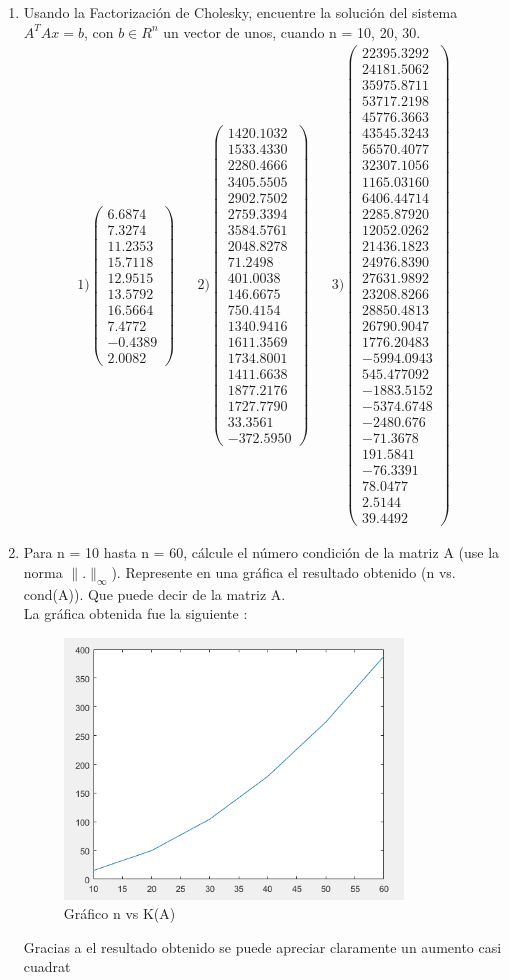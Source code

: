 \documentclass{udpreport}
\providecommand{\norm}[1]{\lVert#1\rVert}
\begin{document}
\begin{enumerate}
 	
 	 \begin {enumerate}
 	    \item Usando la Factorización de Cholesky, encuentre la solución del sistema $A^{T}Ax = b$, con $b \in R^{n}$  un vector de unos, cuando n = 10, 20, 30.
 	        \begin{align*}
 	             1) \left(\begin{array}{c} 6.6874\\7.3274\\11.2353\\15.7118\\ 12.9515\\ 13.5792\\ 16.5664\\ 7.4772\\ -0.4389\\ 2.0082 \end{array}\right) 	 &&   2) \left(\begin{array}{c} 1420.1032\\ 1533.4330\\ 2280.4666\\ 3405.5505\\ 2902.7502\\ 2759.3394\\ 3584.5761\\ 2048.8278\\ 71.2498\\ 401.0038\\ 146.6675\\ 750.4154\\ 1340.9416\\ 1611.3569\\ 1734.8001\\ 1411.6638\\ 1877.2176\\ 1727.7790\\ 33.3561\\ -372.5950 \end{array}\right)   &&  3) \left(\begin{array}{c} 22395.3292\\ 24181.5062\\ 35975.8711\\ 53717.2198\\ 45776.3663\\ 43545.3243\\ 56570.4077\\ 32307.1056\\ 1165.03160\\ 6406.44714\\ 2285.87920\\ 12052.0262\\ 21436.1823\\ 24976.8390\\ 27631.9892\\ 23208.8266\\ 28850.4813\\ 26790.9047\\ 1776.20483\\ -5994.0943\\ 545.477092\\ -1883.5152\\ -5374.6748\\ -2480.676\\ -71.3678\\ 191.5841\\ -76.3391\\ 78.0477\\ 2.5144\\ 39.4492 \end{array}\right) 
 	        \end{align*}
	        
 	        \item Para n = 10 hasta n = 60, cálcule el número condición de la matriz A (use la norma $\norm{.}_{\infty}$). Represente en una gráfica el resultado obtenido (n vs. cond(A)). Que puede decir de la matriz A.\\
 	        
 	        La gráfica obtenida fue la siguiente :
            \begin{figure}[H]
                \centering
                \includegraphics[width=9cm]{Grafico2b}
                \caption{Gráfico n vs K(A)} \label{fig:Grafico2b}
            \end{figure}
            
            Gracias a el resultado obtenido se puede apreciar claramente un aumento casi cuadrat
\end{enumerate}
\end{enumerate}
\end{document}
